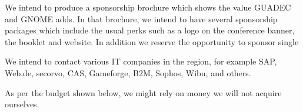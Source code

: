 We intend to produce a sponsorship brochure which shows the value GUADEC and GNOME adds.
In that brochure, we intend to have several sponsorship packages which include the usual perks such as a logo on the conference banner, the booklet and website.
In addition we reserve the opportunity to sponsor single 

We intend to contact various IT companies in the region, for example SAP, Web.de, secorvo, 
CAS, Gameforge, B2M, 
Sophos, Wibu,
and others.


As per the budget shown below, we might rely on money we will not acquire ourselves.
